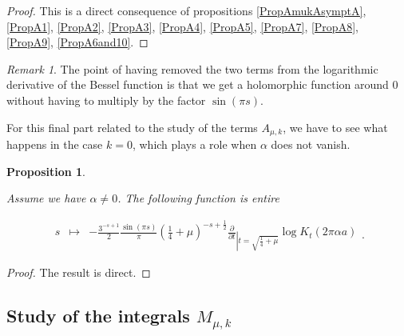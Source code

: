 \documentclass{jams-l}
\newtheorem{proposition}[theorem]{Proposition}
\theoremstyle{definition}
\theoremstyle{remark}
\newtheorem{remark}[theorem]{Remark}
\numberwithin{equation}{section}
\begin{document}
            \begin{proof}
            
                This is a direct consequence of propositions \ref{PropAmukAsymptA}, \ref{PropA1}, \ref{PropA2}, \ref{PropA3}, \ref{PropA4}, \ref{PropA5}, \ref{PropA7}, \ref{PropA8}, \ref{PropA9}, \ref{PropA6and10}.
            
            \end{proof}
            
            \begin{remark}
            
                The point of having removed the two terms from the logarithmic derivative of the Bessel function is that we get a holomorphic function around $0$ without having to multiply by the factor $\sin \left( \pi s \right)$.
            
            \end{remark}
            
            For this final part related to the study of the terms $A_{\mu,k}$, we have to see what happens in the case $k = 0$, which plays a role when $\alpha$ does not vanish.
            
            \begin{proposition}
            \label{PropA11-0}
            
                Assume we have $\alpha \neq 0$. The following function is entire
                
                \[ \begin{array}{lll}
                        s & \longmapsto & - \frac{3^{-s+1}}{2} \frac{\sin \left( \pi s \right)}{\pi} \left( \frac{1}{4} + \mu \right)^{- s + \frac{1}{2}} \frac{\partial}{\partial t}_{\left \vert t = \sqrt{\frac{1}{4} + \mu} \right.} \log K_t \left( 2 \pi \alpha a \right)
                    \end{array} . \]
            
            \end{proposition}
            
            \begin{proof}
            
                The result is direct.
            
            \end{proof}
        
        
    
    \subsection{\texorpdfstring{Study of the integrals $M_{\mu,k}$}{Study of the integrals Mmu,k}}
    \label{SubSecStudyMmuk}
    
\end{document}
